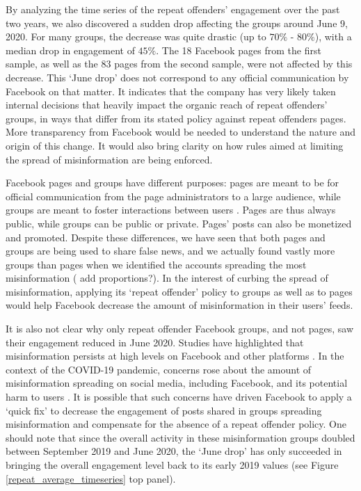 \documentclass[review]{elsarticle}
\begin{document}
{By analyzing the time series of the repeat offenders’ engagement over the past two years, we also discovered a sudden drop affecting the groups around June 9, 2020.
For many groups, the decrease was quite drastic (up to $70\%$ - $80\%$), with a median drop in engagement of $45\%$.
The 18 Facebook pages from the first sample, as well as the 83 pages from the second sample, were not affected by this decrease.
This `June drop' does not correspond to any official communication by Facebook on that matter. 
It indicates that the company has very likely taken internal decisions that heavily impact the organic reach of repeat offenders' groups, in ways that differ from its stated policy against repeat offenders pages.
More transparency from Facebook would be needed to understand the nature and origin of this change. 
It would also bring clarity on how rules aimed at limiting the spread of misinformation are being enforced.

Facebook pages and groups have different purposes: pages are meant to be for official communication from the page administrators to a large audience, while groups are meant to foster interactions between users \citep{differenceGroupAndPage}. 
Pages are thus always public, while groups can be public or private.
Pages' posts can also be monetized and promoted.
Despite these differences, we have seen that both pages and groups are being used to share false news, and we actually found vastly more groups than pages when we identified the accounts spreading the most misinformation ({\color{red} add proportions?}). 
In the interest of curbing the spread of misinformation, applying its `repeat offender' policy to groups as well as to pages would help Facebook decrease the amount of misinformation in their users’ feeds. 

It is also not clear why only repeat offender Facebook groups, and not pages, saw their engagement reduced in June 2020.
Studies have highlighted that misinformation persists at high levels on Facebook and other platforms \citep{kornbluh2020new, resnick2018iffy}.
In the context of the COVID-19 pandemic, concerns rose about the amount of misinformation spreading on social media, including Facebook, and its potential harm to users \citep{johnson2020online}.
It is possible that such concerns have driven Facebook to apply a `quick fix' to decrease the engagement of posts shared in groups spreading misinformation and compensate for the absence of a repeat offender policy.
One should note that since the overall activity in these misinformation groups doubled between September 2019 and June 2020, the `June drop' has only succeeded in bringing the overall engagement level back to its early 2019 values (see Figure \ref{repeat_average_timeseries} top panel).

}
\end{document}
